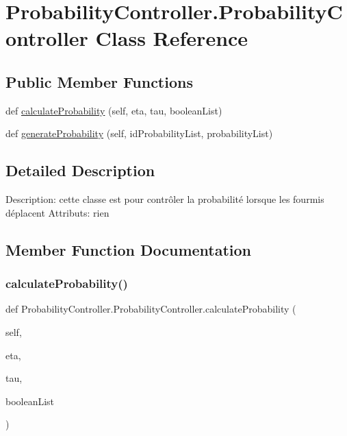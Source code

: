 \hypertarget{class_probability_controller_1_1_probability_controller}{}\section{Probability\+Controller.\+Probability\+Controller Class Reference}
\label{class_probability_controller_1_1_probability_controller}
\subsection*{Public Member Functions}
\begin{DoxyCompactItemize}
\item 
def \mbox{\hyperlink{class_probability_controller_1_1_probability_controller_a842dac0f2f434e2ddab5d108c70e13fb}{calculate\+Probability}} (self, eta, tau, boolean\+List)
\item 
def \mbox{\hyperlink{class_probability_controller_1_1_probability_controller_a0cb0e1ffa81219cf1493859c897edb01}{generate\+Probability}} (self, id\+Probability\+List, probability\+List)
\end{DoxyCompactItemize}


\subsection{Detailed Description}
\begin{DoxyVerb}Description: cette classe est pour contrôler la probabilité lorsque les fourmis déplacent
Attributs: rien
\end{DoxyVerb}
 

\subsection{Member Function Documentation}
\mbox{\label{class_probability_controller_1_1_probability_controller_a842dac0f2f434e2ddab5d108c70e13fb}} 
\subsubsection{\texorpdfstring{calculate\+Probability()}{calculateProbability()}}
{\footnotesize\ttfamily def Probability\+Controller.\+Probability\+Controller.\+calculate\+Probability (\begin{DoxyParamCaption}\item[{}]{self,  }\item[{}]{eta,  }\item[{}]{tau,  }\item[{}]{boolean\+List }\end{DoxyParamCaption})}

